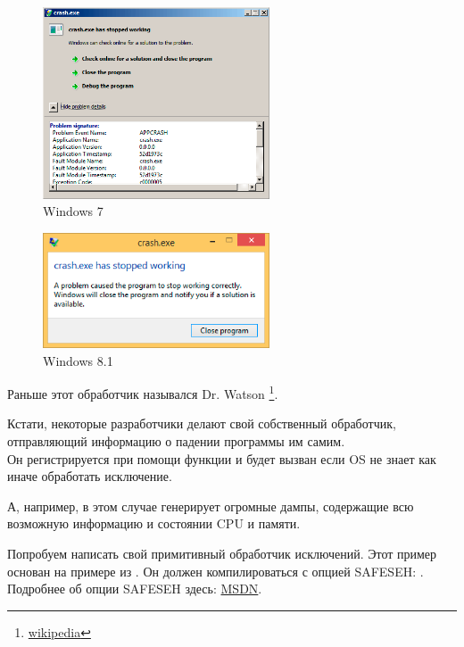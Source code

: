 \begin{figure}[H]
\centering
\includegraphics[width=0.6\textwidth]{OS/SEH/1/crash_win7.png}
\caption{Windows 7}
\end{figure}

\begin{figure}[H]
\centering
\includegraphics[width=0.6\textwidth]{OS/SEH/1/crash_win81.png}
\caption{Windows 8.1}
\end{figure}

Раньше этот обработчик назывался Dr. Watson
\footnote{\href{http://go.yurichev.com/17046}{wikipedia}}.

Кстати, некоторые разработчики делают свой собственный обработчик,
отправляющий информацию о падении программы им самим.\\
Он регистрируется при помощи функции  
и будет вызван если \ac{OS} не знает как иначе обработать исключение.

\myindex{\oracle}
А, например, \oracle в этом случае генерирует огромные дампы, 
содержащие всю возможную информацию и состоянии \ac{CPU} и памяти.

Попробуем написать свой примитивный обработчик исключений.
Этот пример основан на примере из \PietrekSEH.
Он должен компилироваться с опцией SAFESEH: .
Подробнее об опции SAFESEH здесь: \href{http://go.yurichev.com/17252}{MSDN}.
	
